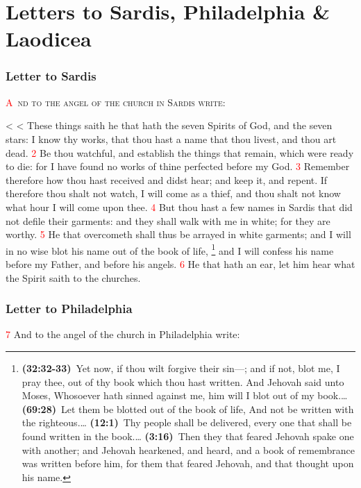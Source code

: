 \documentclass[12pt,twoside]{memoir}
\makeatletter
\newcommand{\cbibleref}[3]{\textbf{\ibibleverse[textit]{#1}(#2)}\ {#3}}
\newcommand{\vnum}[1]{\textcolor{red}{\normalsize{#1}}}
\def\zz{%
\ifnum\prevgraf<\c@L@lines
\zzc\z@
\loop
\ifnum\zzc<\prevgraf
\advance\zzc\@ne
\afterassignment\zzda\count@\L@parshape\relax
\repeat
\parshape\L@parshape
\fi}
\def\zzda{\afterassignment\zzdb\dimen@}
\def\zzdb{\afterassignment\zzdef\dimen@}
\def\zzdef#1\relax{\edef\L@parshape{\the\numexpr\count@-1\relax\space #1}}
\makeatother
\begin{document}
\chapter{Letters to Sardis, Philadelphia \& Laodicea}
\subsection*{Letter to Sardis}
\lettrine[lines=3]{\textcolor{red}{A}}{\ nd to the angel of the church in Sardis write}:

\zz These things saith he that hath the seven Spirits of God, and the seven stars: I know thy works, that thou hast a name that thou livest, and thou art dead. %
\vnum{2} Be thou watchful, and establish the things that remain, which were ready to die: for I have found no works of thine perfected before my God. %
\vnum{3} Remember therefore how thou hast received and didst hear; and keep it, and repent. If therefore thou shalt not watch, I will come as a thief, and thou shalt not know what hour I will come upon thee. %
\vnum{4} But thou hast a few names in Sardis that did not defile their garments: and they shall walk with me in white; for they are worthy. %
\vnum{5} He that overcometh shall thus be arrayed in white garments; and I will in no wise blot his name out of the book of life,%
	\footnote{\cbibleref{Exodus}{32:32-33}{Yet now, if thou wilt forgive their sin—; and if not, blot me, I pray thee, out of thy book which thou hast written. And Jehovah said unto Moses, Whosoever hath sinned against me, him will I blot out of my book.}\ldots%
			\cbibleref{Psalms}{69:28}{Let them be blotted out of the book of life, And not be written with the righteous.}\ldots%
			\cbibleref{Daniel}{12:1}{Thy people shall be delivered, every one that shall be found written in the book.}\ldots%
			\cbibleref{Malachi}{3:16}{Then they that feared Jehovah spake one with another; and Jehovah hearkened, and heard, and a book of remembrance was written before him, for them that feared Jehovah, and that thought upon his name.}}
 and I will confess his name before my Father, and before his angels. %
\vnum{6} He that hath an ear, let him hear what the Spirit saith to the churches.
\subsection*{Letter to Philadelphia}
\vnum{7} And to the angel of the church in Philadelphia write:
\end{document}
